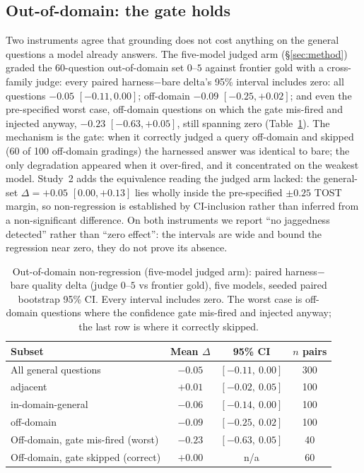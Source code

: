 \documentclass[10pt,twocolumn]{article}
\begin{document}
\subsection{Out-of-domain: the gate holds}\label{sec:ood}
Two instruments agree that grounding does not cost anything on the general questions a model already
answers. The five-model judged arm (\S\ref{sec:method}) graded the 60-question out-of-domain set
$0$--$5$ against frontier gold with a cross-family judge: every paired harness$-$bare delta's 95\% interval includes
zero: all questions $-0.05$ $[-0.11,0.00]$; off-domain $-0.09$ $[-0.25,+0.02]$; and even the
pre-specified worst case, off-domain questions on which the gate mis-fired and injected anyway,
$-0.23$ $[-0.63,+0.05]$, still spanning zero (Table~\ref{tab:ood}). The mechanism is the gate: when it
correctly judged a query off-domain and skipped (60 of 100 off-domain gradings) the harnessed answer
was identical to bare; the only degradation appeared when it over-fired, and it concentrated on the
weakest model. Study~2 adds the equivalence reading the judged arm lacked: the general-set
$\Delta=+0.05$ $[0.00,+0.13]$ lies wholly inside the pre-specified $\pm0.25$ TOST margin, so
non-regression is established by CI-inclusion rather than inferred from a non-significant difference.
On both instruments we report ``no jaggedness detected'' rather than ``zero effect'': the intervals are wide and
bound the regression near zero, they do not prove its absence.

\begin{table}[t]\centering\small
\caption{Out-of-domain non-regression (five-model judged arm): paired harness$-$bare quality delta (judge
$0$--$5$ vs frontier gold), five models, seeded paired bootstrap 95\% CI. Every interval includes
zero. The worst case is off-domain questions where the confidence gate mis-fired and injected anyway;
the last row is where it correctly skipped.}
\label{tab:ood}
\begin{tabular}{lccc}
\toprule
Subset & Mean $\Delta$ & 95\% CI & $n$ pairs \\
\midrule
All general questions              & $-0.05$ & $[-0.11,\ 0.00]$ & 300 \\
\quad adjacent                     & $+0.01$ & $[-0.02,\ 0.05]$ & 100 \\
\quad in-domain-general            & $-0.06$ & $[-0.14,\ 0.00]$ & 100 \\
\quad off-domain                   & $-0.09$ & $[-0.25,\ 0.02]$ & 100 \\
Off-domain, gate mis-fired (worst) & $-0.23$ & $[-0.63,\ 0.05]$ & 40 \\
Off-domain, gate skipped (correct) & $+0.00$ & n/a              & 60 \\
\bottomrule
\end{tabular}
\end{table}
\end{document}
